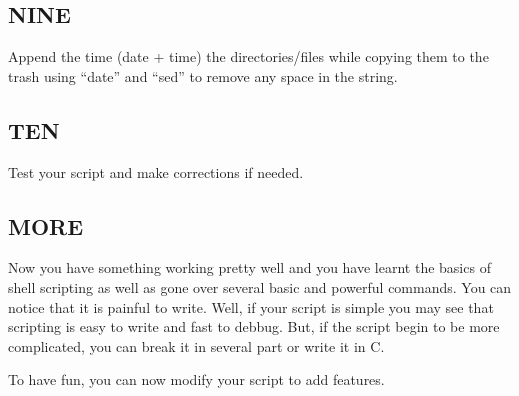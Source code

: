 \subsection{NINE}
Append the time (date + time) the directories/files while copying them to the trash using ``date'' and ``sed'' to remove any space in the string.

\subsection{TEN}
Test your script and make corrections if needed.

\subsection{MORE}
Now you have something working pretty well and you have learnt the basics of shell scripting as well as gone over several basic and powerful commands.
You can notice that it is painful to write. Well, if your script is simple you may see that scripting is easy to write and fast to debbug.
But, if the script begin to be more complicated, you can break it in several part or write it in C.

To have fun, you can now modify your script to add features.
